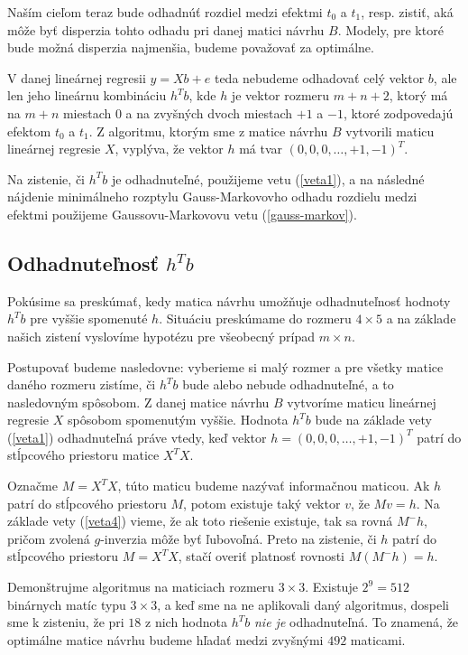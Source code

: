 Naším cieľom teraz bude odhadnúť rozdiel medzi efektmi $t_0$ a $t_1$, resp. zistiť, 
aká môže byť disperzia tohto odhadu pri danej matici návrhu $B$. 
Modely, pre ktoré bude možná disperzia najmenšia, budeme považovať za optimálne.

V danej lineárnej regresii $y = X b + e$ teda nebudeme odhadovať celý vektor $b$, 
ale len jeho lineárnu kombináciu $h^T b$, kde $h$ je vektor rozmeru $m + n + 2$, 
ktorý má na $m + n$ miestach $0$ a na zvyšných dvoch miestach $+1$ a $-1$, ktoré zodpovedajú efektom $t_0$ a $t_1$. 
Z algoritmu, ktorým sme z matice návrhu $B$ vytvorili maticu lineárnej regresie $X$, 
vyplýva, že vektor $h$ má tvar $(0, 0, 0, \ldots, +1, -1)^T$.

Na zistenie, či $h^T b$ je odhadnuteľné, použijeme vetu (\ref{veta1}), 
a na následné nájdenie minimálneho rozptylu Gauss-Markovovho odhadu rozdielu medzi efektmi 
použijeme Gaussovu-Markovovu vetu (\ref{gauss-markov}).

\subsection{Odhadnuteľnosť $h^T b$}

Pokúsime sa preskúmať, kedy matica návrhu umožňuje odhadnuteľnosť hodnoty $h^T b$ pre vyššie spomenuté $h$. 
Situáciu preskúmame do rozmeru $4 \times 5$ a na základe našich zistení vyslovíme hypotézu pre všeobecný prípad $m \times n$.

Postupovať budeme nasledovne: vyberieme si malý rozmer a pre všetky matice daného rozmeru zistíme, 
či $h^T b$ bude alebo nebude odhadnuteľné, a to nasledovným spôsobom. 
Z danej matice návrhu $B$ vytvoríme maticu lineárnej regresie $X$ spôsobom spomenutým vyššie. 
Hodnota $h^T b$ bude na základe vety (\ref{veta1}) odhadnuteľná práve vtedy, 
keď vektor $h = (0, 0, 0, \ldots, +1, -1)^T$ patrí do stĺpcového priestoru matice $X^T X$.

Označme $M = X^T X$, túto maticu budeme nazývať informačnou maticou. 
Ak $h$ patrí do stĺpcového priestoru $M$, potom existuje taký vektor $v$, že $M v = h$. 
Na základe vety (\ref{veta4}) vieme, že ak toto riešenie existuje, tak sa rovná $M^- h$, pričom zvolená $g$-inverzia môže byť ľubovoľná.
Preto na zistenie, či $h$ patrí do stĺpcového priestoru $M = X^T X$, stačí overiť platnosť rovnosti $M(M^- h) = h$. 

Demonštrujme algoritmus na maticiach rozmeru $3 \times 3$. Existuje $2^9 = 512$ binárnych matíc typu $3 \times 3$, 
a keď sme na ne aplikovali daný algoritmus, dospeli sme k zisteniu, že pri $18$ z nich hodnota $h^T b$ \emph{nie je} odhadnuteľná.
To znamená, že optimálne matice návrhu budeme hľadať medzi zvyšnými $492$ maticami.

